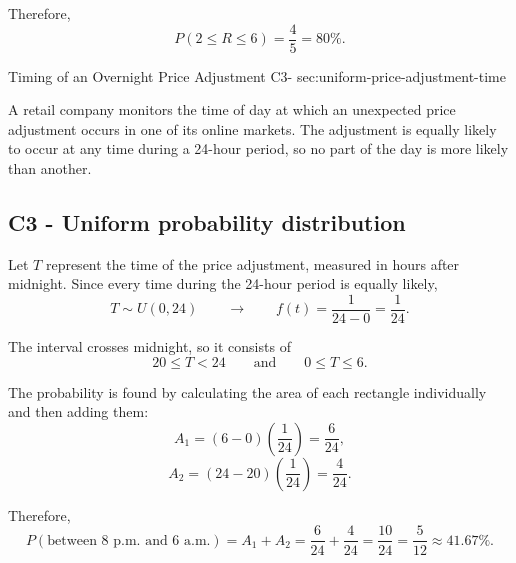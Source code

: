 {		Therefore,
		\[
		\boxed{P(2\le R\le6)=\frac45=80\%}.
		\]
		
		
		
		\vspace{-5mm}
		
	}
	
	\sectionScored
	{Timing of an Overnight Price Adjustment}
	{C3-}
	{sec:uniform-price-adjustment-time}
	{
		A retail company monitors the time of day at which an unexpected
		price adjustment occurs in one of its online markets. The adjustment
		is equally likely to occur at any time during a 24-hour period,
		so no part of the day is more likely than another.
		
		
		\label{subsec:uniform-price-adjustment-time-probability}
		\subsection*{C3 - Uniform probability distribution }
		
		Let \(T\) represent the time of the price adjustment, measured in hours
		after midnight. Since every time during the 24-hour period is equally
		likely,
		\[
		T\sim U(0,24)
		\qquad \longrightarrow \qquad
		f(t)=\frac1{24-0}=\frac1{24}.
		\]
		
		The interval crosses midnight, so it consists of
		\[
		20\le T<24
		\qquad\text{and}\qquad
		0\le T\le6.
		\]
		
		The probability is found by calculating the area of each rectangle
		individually and then adding them:
		\[
		A_1=(6-0)\left(\frac1{24}\right)
		=\frac6{24},
		\]
		\[
		A_2=(24-20)\left(\frac1{24}\right)
		=\frac4{24}.
		\]
		
		Therefore,
		\[
		P(\text{between 8 p.m. and 6 a.m.})
		=
		A_1+A_2
		=
		\frac6{24}+\frac4{24}
		=
		\frac{10}{24}
		=
		\boxed{\frac5{12}\approx41.67\%}.
		\]
		
		}
